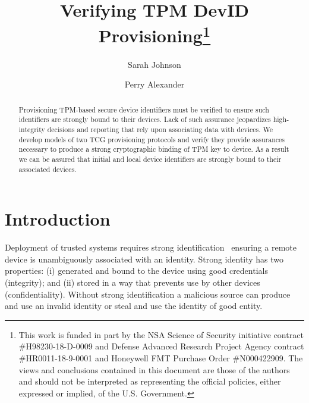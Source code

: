 \documentclass[runningheads]{llncs}
\begin{document}
%
\title{Verifying TPM DevID Provisioning\thanks{This work is funded in part
    by the NSA Science of Security initiative contract
    \#H98230-18-D-0009 and Defense Advanced Research Project Agency
    contract \#HR0011-18-9-0001 and Honeywell FMT Purchase Order
    \#N000422909. The views and conclusions contained in this document
    are those of the authors and should not be interpreted as
    representing the official policies, either expressed or implied,
    of the U.S. Government.}}
%
%
\author{Sarah Johnson \and
Perry Alexander}
%
%
%
\maketitle              %
%
\begin{abstract}
  Provisioning TPM-based secure device identifiers must be verified
  to ensure such identifiers are strongly bound to their devices.
  Lack of such assurance jeopardizes high-integrity decisions and
  reporting that rely upon associating data with devices.  We develop
  models of two TCG provisioning protocols and verify they provide
  assurances necessary to produce a strong cryptographic binding
  of TPM key to device.  As a result we can be assured that initial
  and local device identifiers are strongly bound to their associated
  devices.

\end{abstract}
%
%
%
\section{Introduction}

Deployment of trusted systems requires strong
identification~\citep{Martin:08:The-ten-page-in} ensuring a remote
device is unambiguously associated with an identity. Strong identity
has two properties: (i) generated and bound to the device using good
credentials (integrity); and (ii) stored in a way that prevents use by
other devices (confidentiality).  Without strong identification a
malicious source can produce and use an invalid identity or steal and
use the identity of good entity.
\end{document}
